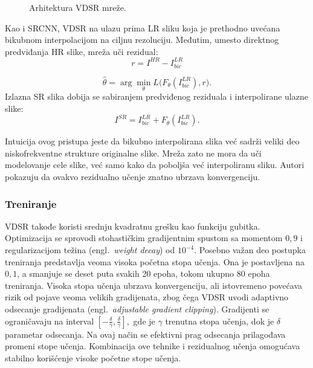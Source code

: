 \documentclass[12pt,a4paper]{article}
\begin{document}
\begin{figure}[H]
	\centering
	
	\caption{Arhitektura VDSR mreže.}
	\label{fig:vdsr}
\end{figure}

Kao i SRCNN, VDSR na ulazu prima LR sliku koja je prethodno uvećana bikubnom interpolacijom na ciljnu rezoluciju. Međutim, umesto direktnog predviđanja HR slike, mreža uči rezidual:
\begin{equation}
	r = I^{HR} - I^{LR}_{bic}
\end{equation}

\begin{equation}
	\hat{\theta}
	=
	\arg\min_{\theta}
	L\bigl(F_{\theta}(I^{LR}_{bic}), r\bigr).
\end{equation}
Izlazna SR slika dobija se sabiranjem predviđenog reziduala i interpolirane ulazne slike:
\begin{equation}
	\label{eq:VDSR}
	I^{SR}
	=
	I^{LR}_{bic}
	+
	F_{\theta}(I^{LR}_{bic}).
\end{equation}

Intuicija ovog pristupa jeste da bikubno interpolirana slika već sadrži veliki deo niskofrekventne strukture originalne slike. Mreža zato ne mora da uči modelovanje cele slike, već samo kako da poboljša već interpoliranu sliku. Autori pokazuju da ovakvo rezidualno učenje znatno ubrzava konvergenciju.

\subsubsection{Treniranje}

VDSR takođe koristi srednju kvadratnu grešku kao funkciju gubitka. Optimizacija se sprovodi stohastičkim gradijentnim spustom sa momentom $0{,}9$ i regularizacijom težina (engl.\ \textit{weight decay}) od $10^{-4}$. Posebno važan deo postupka treniranja predstavlja veoma visoka početna stopa učenja. Ona je postavljena na $0{,}1$, a smanjuje se deset puta svakih 20 epoha, tokom ukupno 80 epoha treniranja. Visoka stopa učenja ubrzava konvergenciju, ali istovremeno povećava rizik od pojave veoma velikih gradijenata, zbog čega VDSR uvodi adaptivno odsecanje gradijenata (engl.\ \textit{adjustable gradient clipping}). Gradijenti se ograničavaju na interval $
\left[
-\frac{\delta}{\gamma},
\frac{\delta}{\gamma}
\right] ,$
gde je $\gamma$ trenutna stopa učenja, dok je $\delta$ parametar odsecanja. Na ovaj način se efektivni prag odsecanja prilagođava promeni stope učenja. Kombinacija ove tehnike i rezidualnog učenja omogućava stabilno korišćenje visoke početne stope učenja.
\end{document}
